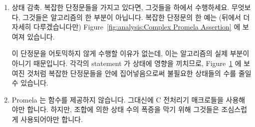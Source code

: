 \begin{enumerate}
{ \scriptsize
\begin{verbbox}
  1 atomic {
  2   i = 0;
  3   sum = 0;
  4   do
  5   :: i < N_QRCU_READERS ->
  6     sum = sum + (readerstart[i] == 1 &&
  7       readerprogress[i] == 1);
  8     i++
  9   :: i >= N_QRCU_READERS ->
 10     assert(sum == 0);
 11     break
 12   od
 13 }
\end{verbbox}
}
\begin{figure}[tbp]
\centering
\theverbbox
\caption{Atomic Block for Complex Promela Assertion}
\label{fig:analysis:Atomic Block for Complex Promela Assertion}
\end{figure}

\item	상태 감축.
	복잡한 단정문들을 가지고 있다면, 그것들을  하에서
	수행하세요.
	무엇보다, 그것들은 알고리즘의 한 부분이 아닙니다.
	복잡한 단정문의 한 예는 (뒤에서 더 자세히 다루겠습니다만)
	Figure~\ref{fig:analysis:Complex Promela Assertion} 에 보여져 있습니다.

	이 단정문을 어토믹하지 않게 수행할 이유가 없는데, 이는 알고리즘의 실제
	부분이 아니기 때문입니다.
	각각의 statement 가 상태에 영향을 끼치므로,
	Figure~\ref{fig:analysis:Atomic Block for Complex Promela Assertion}
	에 보여진 것처럼 복잡한 단정문들을  안에 집어넣음으로써
	불필요한 상태들의 수를 줄일 수 있습니다.

\item	Promela 는 함수를 제공하지 않습니다.
	그대신에 C 전처리기 매크로들을 사용해야만 합니다.
	하지만, 조합에 의한 상태 수의 폭증을 막기 위해 그것들은 조심스럽게
	사용되어야만 합니다.
\iffalse

\item	State reduction.  If you have complex assertions, evaluate
	them under \co{atomic}.  After all, they are not part of the
	algorithm.  One example of a complex assertion (to be discussed
	in more detail later) is as shown in
	Figure~\ref{fig:analysis:Complex Promela Assertion}.

	There is no reason to evaluate this assertion
	non-atomically, since it is not actually part of the algorithm.
	Because each statement contributes to state, we can reduce
	the number of useless states by enclosing it in an \co{atomic}
	block as shown in
	Figure~\ref{fig:analysis:Atomic Block for Complex Promela Assertion}.

\item	Promela does not provide functions.
	You must instead use C preprocessor macros.
	However, you must use them carefully in order to avoid
	combinatorial explosion.
\fi
\end{enumerate}

